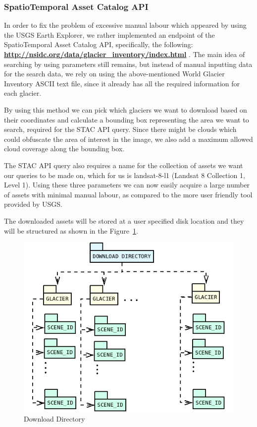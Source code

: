 \documentclass[11pt, a4paper]{report}
\begin{document}
	\subsubsection{SpatioTemporal Asset Catalog API}
	\label{seq:STAC}
	
	In order to fix the problem of excessive manual labour which appeared by using the USGS Earth Explorer, we rather implemented an endpoint of the SpatioTemporal Asset Catalog API, specifically, the following: \textbf{\url{http://nsidc.org/data/glacier_inventory/index.html}} \cite{STAC}. The main idea of searching by using parameters still remains, but instead of manual inputting data for the search data, we rely on using the above-mentioned World Glacier Inventory ASCII text file, since it already has all the required information for each glacier.
	
	By using this method we can pick which glaciers we want to download based on their coordinates and calculate a bounding box representing the area we want to search, required for the STAC API query. Since there might be clouds which could obfuscate the area of interest in the image, we also add a maximum allowed cloud coverage along the bounding box.
	
	The STAC API query also requires a name for the collection of assets we want our queries to be made on, which for us is landsat-8-l1 (Landsat 8 Collection 1, Level 1). Using these three parameters we can now easily acquire a large number of assets with minimal manual labour, as compared to the more user friendly tool provided by USGS.
	
	The downloaded assets will be stored at a user specified disk location and they will be structured as shown in the Figure~\ref{fig:DownloadDirectory}.
	\begin{figure}[h]
		\centering
		\includegraphics[scale=0.4]{../images/DownloadDirectory.png}
		\caption{Download Directory}
		\label{fig:DownloadDirectory}
	\end{figure}
	
\end{document}
